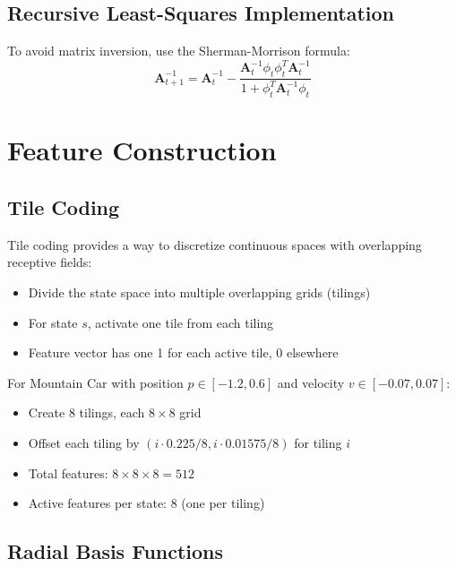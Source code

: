 \subsection{Recursive Least-Squares Implementation}

To avoid matrix inversion, use the Sherman-Morrison formula:
\begin{equation}
\mathbf{A}_{t+1}^{-1} = \mathbf{A}_t^{-1} - \frac{\mathbf{A}_t^{-1} \phi_t \phi_t^T \mathbf{A}_t^{-1}}{1 + \phi_t^T \mathbf{A}_t^{-1} \phi_t}
\end{equation}

\section{Feature Construction}

\subsection{Tile Coding}

Tile coding provides a way to discretize continuous spaces with overlapping receptive fields:

\begin{itemize}
\item Divide the state space into multiple overlapping grids (tilings)
\item For state $s$, activate one tile from each tiling
\item Feature vector has one 1 for each active tile, 0 elsewhere
\end{itemize}

\begin{examplebox}
For Mountain Car with position $p \in [-1.2, 0.6]$ and velocity $v \in [-0.07, 0.07]$:
\begin{itemize}
\item Create 8 tilings, each $8 \times 8$ grid
\item Offset each tiling by $(i \cdot 0.225/8, i \cdot 0.01575/8)$ for tiling $i$
\item Total features: $8 \times 8 \times 8 = 512$
\item Active features per state: 8 (one per tiling)
\end{itemize}
\end{examplebox}

\subsection{Radial Basis Functions}

